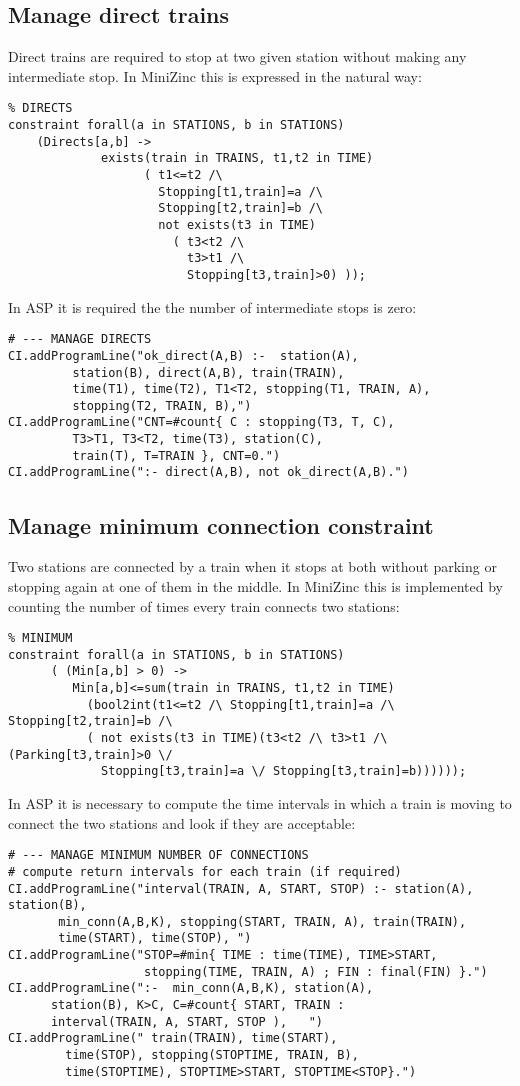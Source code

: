 \documentclass[11pt]{article}
\begin{document}
\subsection{Manage direct trains}
Direct trains are required to stop at two given station without
making any intermediate stop. In MiniZinc this is expressed in the natural way:
\begin{verbatim}
% DIRECTS
constraint forall(a in STATIONS, b in STATIONS)
    (Directs[a,b] -> 
             exists(train in TRAINS, t1,t2 in TIME)
                   ( t1<=t2 /\ 
                     Stopping[t1,train]=a /\
                     Stopping[t2,train]=b /\
                     not exists(t3 in TIME)
                       ( t3<t2 /\ 
                         t3>t1 /\ 
                         Stopping[t3,train]>0) ));
\end{verbatim}
In ASP it is required the the number of intermediate stops is zero:
\begin{verbatim}
# --- MANAGE DIRECTS
CI.addProgramLine("ok_direct(A,B) :-  station(A),
         station(B), direct(A,B), train(TRAIN), 
         time(T1), time(T2), T1<T2, stopping(T1, TRAIN, A),
         stopping(T2, TRAIN, B),")
CI.addProgramLine("CNT=#count{ C : stopping(T3, T, C),
         T3>T1, T3<T2, time(T3), station(C),
         train(T), T=TRAIN }, CNT=0.")
CI.addProgramLine(":- direct(A,B), not ok_direct(A,B).")
\end{verbatim}
\subsection{Manage minimum connection constraint}
Two stations are connected by a train when it stops at both without parking 
or stopping again at one of them in the middle. In MiniZinc this is implemented
by counting the number of times every train connects two stations:
\begin{verbatim}
% MINIMUM
constraint forall(a in STATIONS, b in STATIONS)
      ( (Min[a,b] > 0) -> 
         Min[a,b]<=sum(train in TRAINS, t1,t2 in TIME)
           (bool2int(t1<=t2 /\ Stopping[t1,train]=a /\ Stopping[t2,train]=b /\
           ( not exists(t3 in TIME)(t3<t2 /\ t3>t1 /\ (Parking[t3,train]>0 \/
             Stopping[t3,train]=a \/ Stopping[t3,train]=b))))));
\end{verbatim}
In ASP it is necessary to compute the time intervals in which a train is 
moving to connect the two stations and look if they are acceptable:
\begin{verbatim}
# --- MANAGE MINIMUM NUMBER OF CONNECTIONS
# compute return intervals for each train (if required)
CI.addProgramLine("interval(TRAIN, A, START, STOP) :- station(A), station(B),
       min_conn(A,B,K), stopping(START, TRAIN, A), train(TRAIN),
       time(START), time(STOP), ")
CI.addProgramLine("STOP=#min{ TIME : time(TIME), TIME>START,
                   stopping(TIME, TRAIN, A) ; FIN : final(FIN) }.")
CI.addProgramLine(":-  min_conn(A,B,K), station(A),
      station(B), K>C, C=#count{ START, TRAIN :
      interval(TRAIN, A, START, STOP ),   ")
CI.addProgramLine(" train(TRAIN), time(START),
        time(STOP), stopping(STOPTIME, TRAIN, B),
        time(STOPTIME), STOPTIME>START, STOPTIME<STOP}.")
\end{verbatim}
\end{document}
